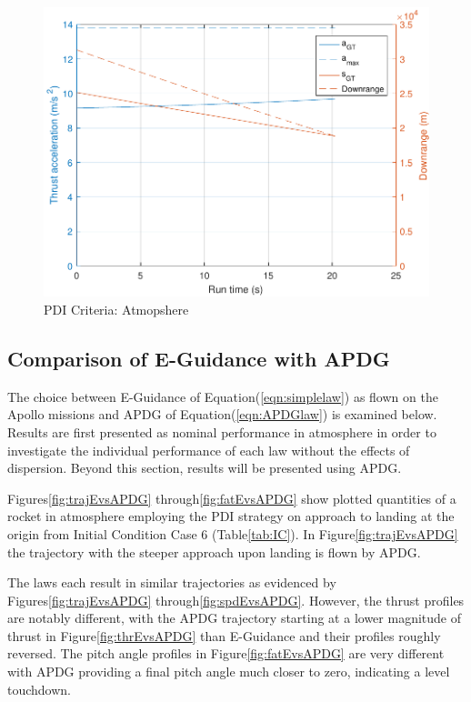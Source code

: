 \begin{figure}[H]
	\centering
	\begin{minipage}{4.3 in}
		\includegraphics[width=\linewidth]{Figures/gtcriteriaatmo.pdf}
		\caption{PDI Criteria: Atmopshere \label{fig:gtcriteriaatmo} }
	\end{minipage}
\end{figure}


\subsection{Comparison of E-Guidance with APDG} \label{sec:lawcomp}

The choice between E-Guidance of Equation\:(\ref{eqn:simplelaw}) as flown on the Apollo missions and APDG of Equation\:(\ref{eqn:APDGlaw}) is examined below. Results are first presented as nominal performance in atmosphere in order to investigate the individual performance of each law without the effects of dispersion. Beyond this section, results will be presented using APDG.

Figures\:\ref{fig:trajEvsAPDG} through\:\ref{fig:fatEvsAPDG} show plotted quantities of a rocket in atmosphere employing the PDI strategy on approach to landing at the origin from Initial Condition Case 6 (Table\:\ref{tab:IC}). In Figure\:\ref{fig:trajEvsAPDG} the trajectory with the steeper approach upon landing is flown by APDG. 

The laws each result in similar trajectories as evidenced by Figures\:\ref{fig:trajEvsAPDG} through\:\ref{fig:spdEvsAPDG}. However, the thrust profiles are notably different, with the APDG trajectory starting at a lower magnitude of thrust in Figure\:\ref{fig:thrEvsAPDG} than E-Guidance and their profiles roughly reversed. The pitch angle profiles in Figure\:\ref{fig:fatEvsAPDG} are very different with APDG providing a final pitch angle much closer to zero, indicating a level touchdown.

